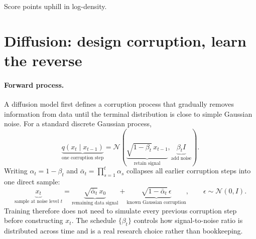 \begin{calloutmemoryhook}
Score points uphill in log-density.
\end{calloutmemoryhook}

\section{Diffusion: design corruption, learn the reverse}

\paragraph{Forward process.}
A diffusion model first defines a corruption process that gradually removes information from data until the terminal distribution is close to simple Gaussian noise.
For a standard discrete Gaussian process,
\[
\underbrace{q(x_t\mid x_{t-1})}_{\text{one corruption step}}
=
\mathcal N\!\left(
\underbrace{\sqrt{1-\beta_t}\,x_{t-1}}_{\text{retain signal}},
\underbrace{\beta_t I}_{\text{add noise}}
\right).
\]
Writing $\alpha_t=1-\beta_t$ and $\bar\alpha_t=\prod_{s=1}^{t}\alpha_s$ collapses all earlier corruption steps into one direct sample:
\[
\boxed{
\underbrace{x_t}_{\text{sample at noise level }t}
=
\underbrace{\sqrt{\bar\alpha_t}\,x_0}_{\text{remaining data signal}}
+
\underbrace{\sqrt{1-\bar\alpha_t}\,\epsilon}_{\text{known Gaussian corruption}},
\qquad \epsilon\sim\mathcal N(0,I)
}.
\]
Training therefore does not need to simulate every previous corruption step before constructing $x_t$.
The schedule $\{\beta_t\}$ controls how signal-to-noise ratio is distributed across time and is a real research choice rather than bookkeeping.

